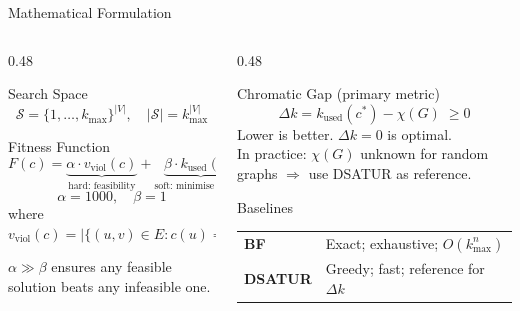\documentclass[aspectratio=169,10pt]{beamer}
\newcommand{\col}{c}
\newcommand{\kmax}{k_{\max}}
\newcommand{\kused}{k_{\text{used}}}
\newcommand{\viol}{v_{\text{viol}}}
\newcommand{\gap}{\Delta k}
\newcommand{\fitF}{F}
\begin{document}
\begin{frame}{Mathematical Formulation}

\begin{columns}[T]
\begin{column}{0.48\textwidth}
\begin{block}{Search Space}
\[
  \mathcal{S} = \{1,\ldots,\kmax\}^{|V|}, \quad |\mathcal{S}| = \kmax^{|V|}
\]
\end{block}

\vspace{0.5em}
\begin{block}{Fitness Function}
\[
  \fitF(\col) = \underbrace{\alpha\cdot\viol(\col)}_{\text{hard: feasibility}}
              + \underbrace{\beta\cdot\kused(\col)}_{\text{soft: minimise colours}}
\]
\[
  \alpha = 1000,\quad \beta = 1
\]
where $\viol(\col) = |\{(u,v)\in E : \col(u)=\col(v)\}|$
\end{block}

\vspace{0.5em}
$\alpha \gg \beta$ ensures any feasible solution beats any infeasible one.
\end{column}

\begin{column}{0.48\textwidth}
\begin{block}{Chromatic Gap (primary metric)}
\[
  \gap = \kused(\col^*) - \chi(G) \;\geq 0
\]
Lower is better. $\gap = 0$ is optimal.\\[0.5em]
In practice: $\chi(G)$ unknown for random graphs $\Rightarrow$ use DSATUR as reference.
\end{block}

\vspace{0.5em}
\begin{block}{Baselines}
\begin{tabular}{ll}
\textbf{BF} & Exact; exhaustive; $O(\kmax^n)$\\
\textbf{DSATUR} & Greedy; fast; reference for $\gap$
\end{tabular}
\end{block}
\end{column}
\end{columns}

\end{frame}
\end{document}
